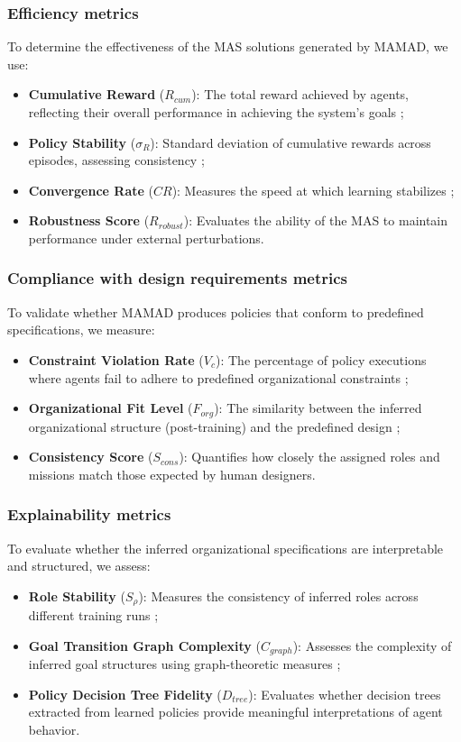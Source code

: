 \documentclass[pdflatex,sn-mathphys-num]{sn-jnl}%
\theoremstyle{thmstyleone}%
\theoremstyle{thmstyletwo}%
\theoremstyle{thmstylethree}%
\begin{document}
\subsubsection{Efficiency metrics}
To determine the effectiveness of the MAS solutions generated by MAMAD, we use:
\begin{itemize}
    \item \textbf{Cumulative Reward} ($R_{cum}$): The total reward achieved by agents, reflecting their overall performance in achieving the system's goals ;
    \item \textbf{Policy Stability} ($\sigma_R$): Standard deviation of cumulative rewards across episodes, assessing consistency ;
    \item \textbf{Convergence Rate} ($CR$): Measures the speed at which learning stabilizes ;
    \item \textbf{Robustness Score} ($R_{robust}$): Evaluates the ability of the MAS to maintain performance under external perturbations.
\end{itemize}

\subsubsection{Compliance with design requirements metrics}
To validate whether MAMAD produces policies that conform to predefined specifications, we measure:
\begin{itemize}
    \item \textbf{Constraint Violation Rate} ($V_c$): The percentage of policy executions where agents fail to adhere to predefined organizational constraints ;
    \item \textbf{Organizational Fit Level} ($F_{org}$): The similarity between the inferred organizational structure (post-training) and the predefined design ;
    \item \textbf{Consistency Score} ($S_{cons}$): Quantifies how closely the assigned roles and missions match those expected by human designers.
\end{itemize}

\subsubsection{Explainability metrics}
To evaluate whether the inferred organizational specifications are interpretable and structured, we assess:
\begin{itemize}
    \item \textbf{Role Stability} ($S_{\rho}$): Measures the consistency of inferred roles across different training runs ;
    \item \textbf{Goal Transition Graph Complexity} ($C_{graph}$): Assesses the complexity of inferred goal structures using graph-theoretic measures ;
    \item \textbf{Policy Decision Tree Fidelity} ($D_{tree}$): Evaluates whether decision trees extracted from learned policies provide meaningful interpretations of agent behavior.
\end{itemize}
\end{document}
